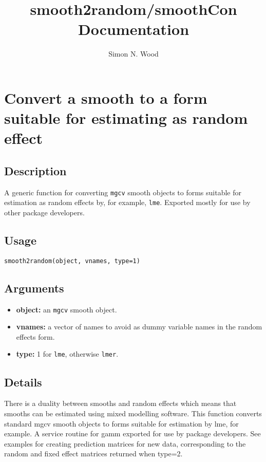 \documentclass{article}
\begin{document}
\title{smooth2random/smoothCon Documentation}
\author{Simon N. Wood}
\maketitle

\section{Convert a smooth to a form suitable for estimating as random effect}
\subsection{Description}
A generic function for converting \texttt{mgcv} smooth objects to forms suitable for estimation as random effects by, for example, \texttt{lme}. Exported mostly for use by other package developers.

\subsection{Usage}
\begin{verbatim}
smooth2random(object, vnames, type=1)
\end{verbatim}

\subsection{Arguments}
\begin{itemize}
    \item \textbf{object:} an \texttt{mgcv} smooth object.
    \item \textbf{vnames:} a vector of names to avoid as dummy variable names in the random effects form.
    \item \textbf{type:} 1 for \texttt{lme}, otherwise \texttt{lmer}.
\end{itemize}

\subsection{Details}
There is a duality between smooths and random effects which means that smooths can be estimated using mixed modelling software. This function converts standard mgcv smooth objects to forms suitable for estimation by lme, for example. A service routine for gamm exported for use by package developers. See examples for creating prediction matrices for new data, corresponding to the random and fixed effect matrices returned when type=2.
\end{document}
